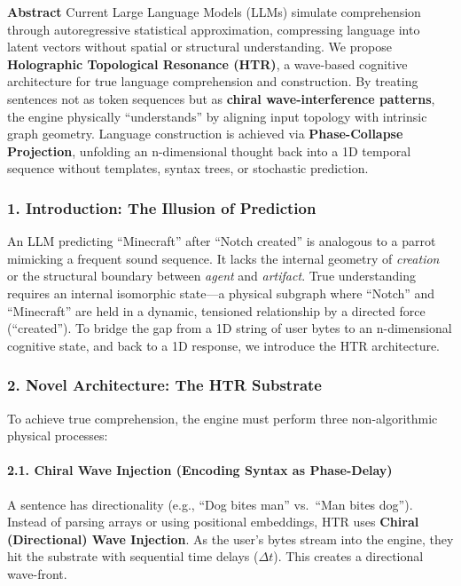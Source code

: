 \documentclass[
  11pt,
  a4paper,
]{article}
\begin{document}
\textbf{Abstract} Current Large Language Models (LLMs) simulate
comprehension through autoregressive statistical approximation,
compressing language into latent vectors without spatial or structural
understanding. We propose \textbf{Holographic Topological Resonance
(HTR)}, a wave-based cognitive architecture for true language
comprehension and construction. By treating sentences not as token
sequences but as \textbf{chiral wave-interference patterns}, the engine
physically ``understands'' by aligning input topology with intrinsic
graph geometry. Language construction is achieved via
\textbf{Phase-Collapse Projection}, unfolding an n-dimensional thought
back into a 1D temporal sequence without templates, syntax trees, or
stochastic prediction.

\subsubsection{1. Introduction: The Illusion of
Prediction}\label{introduction-the-illusion-of-prediction}

An LLM predicting ``Minecraft'' after ``Notch created'' is analogous to
a parrot mimicking a frequent sound sequence. It lacks the internal
geometry of \emph{creation} or the structural boundary between
\emph{agent} and \emph{artifact}. True understanding requires an
internal isomorphic state---a physical subgraph where ``Notch'' and
``Minecraft'' are held in a dynamic, tensioned relationship by a
directed force (``created''). To bridge the gap from a 1D string of user
bytes to an n-dimensional cognitive state, and back to a 1D response, we
introduce the HTR architecture.

\subsubsection{2. Novel Architecture: The HTR
Substrate}\label{novel-architecture-the-htr-substrate}

To achieve true comprehension, the engine must perform three
non-algorithmic physical processes:

\paragraph{2.1. Chiral Wave Injection (Encoding Syntax as
Phase-Delay)}\label{chiral-wave-injection-encoding-syntax-as-phase-delay}

A sentence has directionality (e.g., ``Dog bites man'' vs.~``Man bites
dog''). Instead of parsing arrays or using positional embeddings, HTR
uses \textbf{Chiral (Directional) Wave Injection}. As the user's bytes
stream into the engine, they hit the substrate with sequential time
delays (\(\Delta t\)). This creates a directional wave-front.
\end{document}
